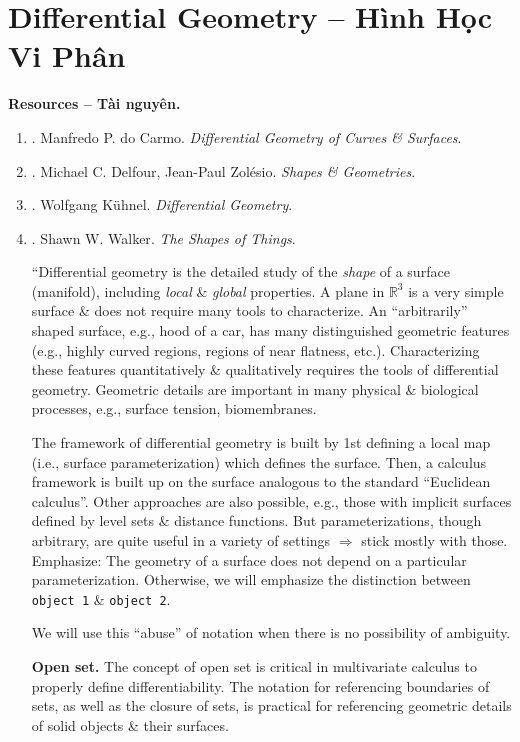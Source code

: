 \documentclass{article}
\begin{document}

\section{Differential Geometry -- Hình Học Vi Phân}
\textbf{\textsf{Resources -- Tài nguyên.}}
\begin{enumerate}
	\item \cite{Carmo2016}. {\sc Manfredo P. do Carmo}. {\it Differential Geometry of Curves \& Surfaces}.
	\item \cite{Delfour_Zolesio2001,Delfour_Zolesio2011}. {\sc Michael C. Delfour, Jean-Paul Zol\'{e}sio}. {\it Shapes \& Geometries}.
	\item \cite{Kuhnel2015}. {\sc Wolfgang K\"uhnel}. {\it Differential Geometry}.
	\item \cite{Walker2015}. {\sc Shawn W. Walker}. {\it The Shapes of Things}.
	
	``Differential geometry is the detailed study of the {\it shape} of a surface (manifold), including {\it local} \& {\it global} properties. A plane in $\mathbb{R}^3$ is a very simple surface \& does not require many tools to characterize. An ``arbitrarily'' shaped surface, e.g., hood of a car, has many distinguished geometric features (e.g., highly curved regions, regions of near flatness, etc.). Characterizing these features quantitatively \& qualitatively requires the tools of differential geometry. Geometric details are important in many physical \& biological processes, e.g., surface tension, biomembranes.
	
	The framework of differential geometry is built by 1st defining a local map (i.e., surface parameterization) which defines the surface. Then, a calculus framework is built up on the surface analogous to the standard ``Euclidean calculus''. Other approaches are also possible, e.g., those with implicit surfaces defined by level sets \& distance functions. But parameterizations, though arbitrary, are quite useful in a variety of settings $\Rightarrow$ stick mostly with those. Emphasize: The geometry of a surface does not depend on a particular parameterization. Otherwise, we will emphasize the distinction between {\tt object 1} \& {\tt object 2}.
	
	We will use this ``abuse'' of notation when there is no possibility of ambiguity.
	
	{\bf Open set.} The concept of open set is critical in multivariate calculus to properly define differentiability. The notation for referencing boundaries of sets, as well as the closure of sets, is practical for referencing geometric details of solid objects \& their surfaces.
	

\end{enumerate}
\end{document}
